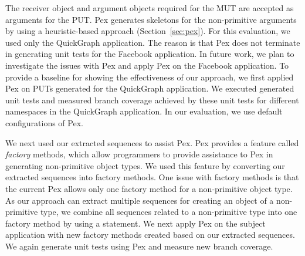 \documentclass{sig-alternate}
\begin{document}
The receiver object and argument objects required for the  MUT are accepted as arguments for the PUT. Pex generates skeletons for the non-primitive arguments by using a heuristic-based approach (Section~\ref{sec:pex}). For this evaluation, we used only the QuickGraph application. The reason is that Pex does not terminate in generating unit tests for the Facebook application. In future work, we plan to investigate the issues with Pex and apply Pex on the Facebook application. To provide a baseline for showing the effectiveness of our approach, we first applied Pex on PUTs generated for the QuickGraph application. We executed generated unit tests and measured branch coverage achieved by these unit tests for different namespaces in the QuickGraph application. In our evaluation, we use default configurations of Pex.

We next used our extracted sequences to assist Pex. Pex provides a feature called \emph{factory} methods, which allow programmers to provide assistance to Pex in generating non-primitive object types. We used this feature by converting our extracted sequences into factory methods. One issue with factory methods is that the current Pex allows only one factory method for a non-primitive object type. As our approach can extract multiple sequences for creating an object of a non-primitive type, we combine all sequences related to a non-primitive type into one factory method by using a  statement. We next apply Pex on the subject application with new factory methods created based on our extracted sequences. We again generate unit tests using Pex and measure new branch coverage. 
\end{document}
